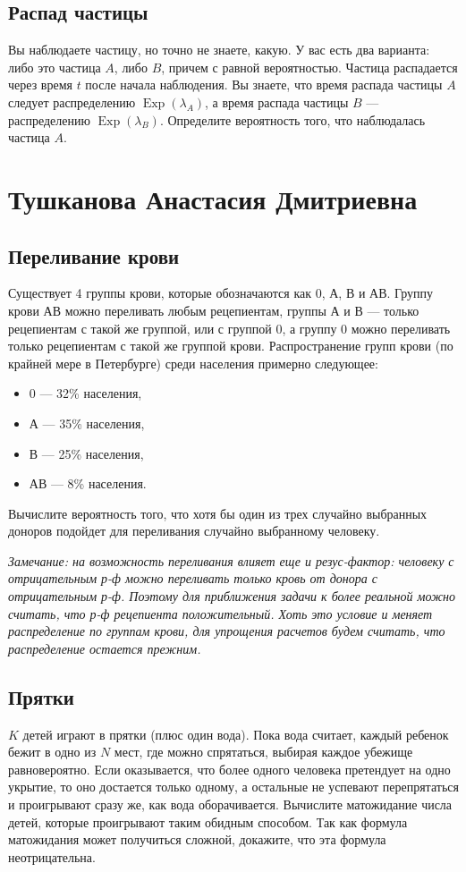 \documentclass[12pt]{article}
\DeclareMathOperator{\Exp}{Exp}
\begin{document}
\subsection{Распад частицы}
Вы наблюдаете частицу, но точно не знаете, какую. У вас есть два варианта: либо это частица $A$, либо $B$, причем с равной вероятностью. Частица распадается через время $t$ после начала наблюдения. Вы знаете, что время распада частицы $A$ следует распределению $\Exp(\lambda_A)$, а время распада частицы $B$ --- распределению $\Exp(\lambda_B)$. Определите вероятность того, что наблюдалась частица $A$.

\newpage
\section{Тушканова Анастасия Дмитриевна}

\subsection{Переливание крови}
Существует 4 группы крови, которые обозначаются как 0, А, В и АВ. Группу крови АВ можно переливать любым рецепиентам, группы А и В --- только рецепиентам с такой же группой, или с группой 0, а группу 0 можно переливать только рецепиентам с такой же группой крови. Распространение групп крови (по крайней мере в Петербурге) среди населения примерно следующее:
\begin{itemize}
    \item 0 --- 32\% населения,
    \item А --- 35\% населения,
    \item В --- 25\% населения,
    \item АВ --- 8\% населения.
\end{itemize}
Вычислите вероятность того, что хотя бы один из трех случайно выбранных доноров подойдет для переливания случайно выбранному человеку. 

\emph{Замечание: на возможность переливания влияет еще и резус-фактор: человеку с отрицательным р-ф можно переливать только кровь от донора с отрицательным р-ф. Поэтому для приближения задачи к более реальной можно считать, что р-ф рецепиента положительный. Хоть это условие и меняет распределение по группам крови, для упрощения расчетов будем считать, что распределение остается прежним.}

\subsection{Прятки}
$K$ детей играют в прятки (плюс один вода). Пока вода считает, каждый ребенок бежит в одно из $N$ мест, где можно спрятаться, выбирая каждое убежище равновероятно. Если оказывается, что более одного человека претендует на одно укрытие, то оно достается только одному, а остальные не успевают перепрятаться и проигрывают сразу же, как вода оборачивается. Вычислите матожидание числа детей, которые проигрывают таким обидным способом. Так как формула матожидания может получиться сложной, докажите, что эта формула неотрицательна.
\end{document}
